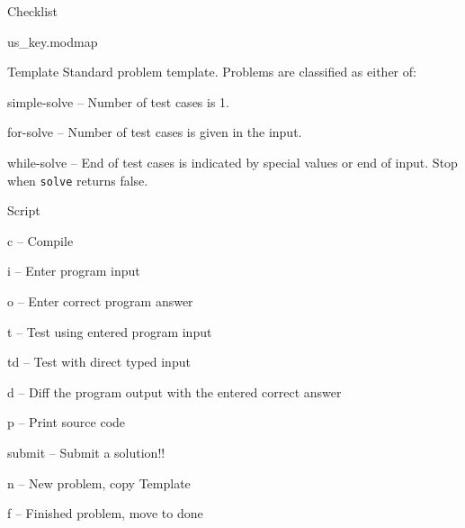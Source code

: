 \categorycontents{}


\begin{algorithm}{Checklist}
\end{algorithm}

\begin{algorithm}{us\_key.modmap}
\end{algorithm}



\begin{algorithm}{Template}
\desc
Standard problem template. Problems are classified as either of:
  \begin{description}
  \item{simple-solve} -- Number of test cases is 1.
  \item{for-solve} -- Number of test cases is given in the input.
  \item{while-solve} -- End of test cases is indicated by special values
    or end of input. Stop when {\tt solve} returns false.
  \end{description}
\end{algorithm}

\begin{algorithm}{Script}
  \begin{description}
  \item{c} -- Compile
  \item{i} -- Enter program input
  \item{o} -- Enter correct program answer
  \item{t} -- Test using entered program input
  \item{td} -- Test with direct typed input
  \item{d} -- Diff the program output with the entered correct answer
  \item{p} -- Print source code
  \item{submit} -- Submit a solution!!
  \item{n} -- New problem, copy Template
  \item{f} -- Finished problem, move to done
  \end{description}
\end{algorithm}

